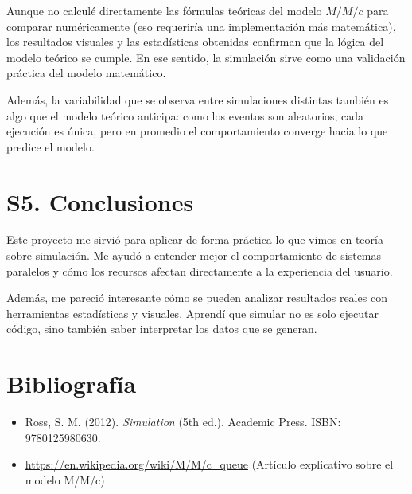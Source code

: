 \documentclass[12pt]{article}
\begin{document}
Aunque no calculé directamente las fórmulas teóricas del modelo $M/M/c$ para comparar numéricamente (eso requeriría una implementación más matemática), los resultados visuales y las estadísticas obtenidas confirman que la lógica del modelo teórico se cumple. En ese sentido, la simulación sirve como una validación práctica del modelo matemático.

Además, la variabilidad que se observa entre simulaciones distintas también es algo que el modelo teórico anticipa: como los eventos son aleatorios, cada ejecución es única, pero en promedio el comportamiento converge hacia lo que predice el modelo.


\section*{S5. Conclusiones}

Este proyecto me sirvió para aplicar de forma práctica lo que vimos en teoría sobre simulación. Me ayudó a entender mejor el comportamiento de sistemas paralelos y cómo los recursos afectan directamente a la experiencia del usuario.

Además, me pareció interesante cómo se pueden analizar resultados reales con herramientas estadísticas y visuales. Aprendí que simular no es solo ejecutar código, sino también saber interpretar los datos que se generan.
\section*{Bibliografía}

\begin{itemize}
  \item Ross, S. M. (2012). \textit{Simulation} (5th ed.). Academic Press. ISBN: 9780125980630.
  
  \item \url{https://en.wikipedia.org/wiki/M/M/c_queue}  
  (Artículo explicativo sobre el modelo M/M/c)

\end{itemize}
\end{document}
